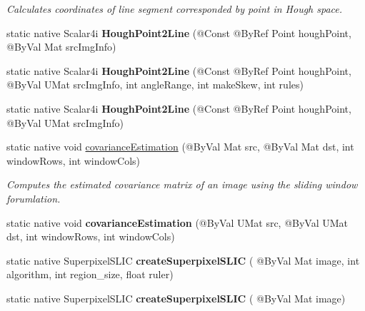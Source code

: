 \begin{DoxyCompactItemize}
\begin{DoxyCompactList}\small\item\em Calculates coordinates of line segment corresponded by point in Hough space. \end{DoxyCompactList}\item 
\mbox{\label{classorg_1_1bytedeco_1_1javacpp_1_1opencv__ximgproc_ad3b76262d53d6b53b310004575be9e84}} 
static native Scalar4i {\bfseries Hough\+Point2\+Line} (@Const @By\+Ref Point hough\+Point, @By\+Val Mat src\+Img\+Info)
\item 
\mbox{\label{classorg_1_1bytedeco_1_1javacpp_1_1opencv__ximgproc_a5bc9b23054460b330913e82837f943fa}} 
static native Scalar4i {\bfseries Hough\+Point2\+Line} (@Const @By\+Ref Point hough\+Point, @By\+Val U\+Mat src\+Img\+Info, int angle\+Range, int make\+Skew, int rules)
\item 
\mbox{\label{classorg_1_1bytedeco_1_1javacpp_1_1opencv__ximgproc_ac089080292d003ff7dea8360e4b987e5}} 
static native Scalar4i {\bfseries Hough\+Point2\+Line} (@Const @By\+Ref Point hough\+Point, @By\+Val U\+Mat src\+Img\+Info)
\item 
static native void \hyperlink{classorg_1_1bytedeco_1_1javacpp_1_1opencv__ximgproc_a821e53d932bd411235484d70e890de32}{covariance\+Estimation} (@By\+Val Mat src, @By\+Val Mat dst, int window\+Rows, int window\+Cols)
\begin{DoxyCompactList}\small\item\em Computes the estimated covariance matrix of an image using the sliding window forumlation. \end{DoxyCompactList}\item 
\mbox{\label{classorg_1_1bytedeco_1_1javacpp_1_1opencv__ximgproc_a88d11ec696a6f030dfefa7ddeeaf863b}} 
static native void {\bfseries covariance\+Estimation} (@By\+Val U\+Mat src, @By\+Val U\+Mat dst, int window\+Rows, int window\+Cols)
\item 
static native Superpixel\+S\+L\+IC {\bfseries create\+Superpixel\+S\+L\+IC} ( @By\+Val Mat image, int algorithm, int region\+\_\+size, float ruler)
\item 
static native Superpixel\+S\+L\+IC {\bfseries create\+Superpixel\+S\+L\+IC} ( @By\+Val Mat image)

\end{DoxyCompactItemize}
